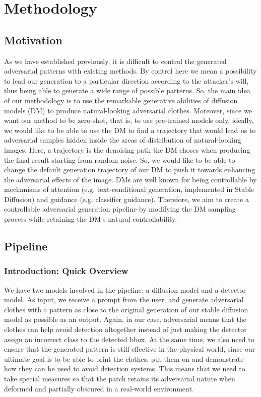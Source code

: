 
\chapter{Methodology}

\section{Motivation}

As we have established previously, it is difficult to control the generated adversarial patterns with existing methods. 
By control here we mean a possibility to lead our generation to a particular direction according to the attacker's will, thus being able to generate a wide range of possible patterns.
So, the main idea of our methodology is to use the remarkable generative abilities of diffusion models (DM) to produce natural-looking adversarial clothes.
Moreover, since we want our method to be zero-shot, that is, to use pre-trained models only, ideally, we would like to be able to use the DM to find a trajectory that would lead us to adversarial samples hidden inside the areas of distribution of natural-looking images.
Here, a trajectory is the denoising path the DM choses when producing the final result starting from random noise. 
So, we would like to be able to change the default generation trajectory of our DM to push it towards enhancing the adversarial effects of the image. DMs are well known for being controllable by mechanisms of attention (e.g. text-conditional generation, implemented in Stable Diffusion)
 and guidance (e.g. classifier guidance).
Therefore, we aim to create a controllable adversarial generation pipeline by modifying the DM sampling process while retaining the DM's natural controllability.

\section{Pipeline}
\subsection{Introduction: Quick Overview}

We have two models involved in the pipeline: a diffusion model and a detector model.
As input, we receive a prompt from the user, and generate adversarial clothes with a pattern as close to the original generation of our stable diffusion model as possible as an output.
Again, in our case, adversarial means that the clothes can help avoid detection altogether instead of just making the detector assign an incorrect class to the detected bbox.
At the same time, we also need to ensure that the generated pattern is still effective in the physical world, since our ultimate goal is to be able to print the clothes, put them on and demonstrate how they can be used to avoid detection systems. This means that we need to take special measures so that the patch retains its adversarial nature when deformed and partially obscured in a real-world environment.


